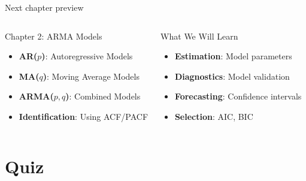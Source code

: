 \documentclass[9pt, aspectratio=169, t]{beamer}
\begin{document}
\begin{frame}{Next chapter preview}
    \begin{columns}[T]
        \begin{block}{Chapter 2: ARMA Models}
            \begin{itemize}\setlength{\itemsep}{0pt}
                \item \textbf{AR($p$)}: Autoregressive Models
                \item \textbf{MA($q$)}: Moving Average Models
                \item \textbf{ARMA($p,q$)}: Combined Models
                \item \textbf{Identification}: Using ACF/PACF
            \end{itemize}
        \end{block}
        \begin{exampleblock}{What We Will Learn}
            \begin{itemize}\setlength{\itemsep}{0pt}
                \item \textbf{Estimation}: Model parameters
                \item \textbf{Diagnostics}: Model validation
                \item \textbf{Forecasting}: Confidence intervals
                \item \textbf{Selection}: AIC, BIC
            \end{itemize}
        \end{exampleblock}
    \end{columns}
\end{frame}

\section{Quiz}
\end{document}
